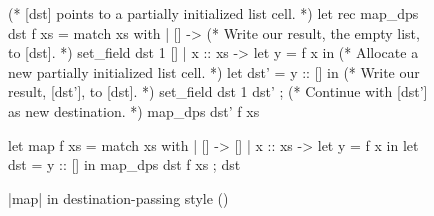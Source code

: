 \begin{figure}[tp]
\begin{OCaml}
(* [dst] points to a partially initialized list cell. *)
let rec map_dps dst f xs =
  match xs with
  | [] ->
      (* Write our result, the empty list, to [dst]. *)
      set_field dst 1 []
  | x :: xs ->
      let y = f x in
      (* Allocate a new partially initialized list cell. *)
      let dst' = y :: [] in
      (* Write our result, [dst'], to [dst]. *)
      set_field dst 1 dst' ;
      (* Continue with [dst'] as new destination. *)
      map_dps dst' f xs

let map f xs =
  match xs with
  | [] ->
      []
  | x :: xs ->
      let y = f x in
      let dst = y :: [] in
      map_dps dst f xs ;
      dst
\end{OCaml}
\caption{\ocaml|map| in destination-passing style (\OCamlLang)}
\label{fig:map_dps}
\end{figure}